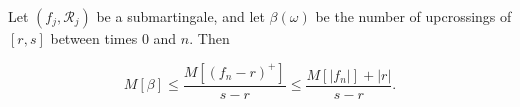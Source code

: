 Let $(f_j, \mathcal{R}_j)$ be a submartingale, and let $\beta(\omega)$ be the number of upcrossings of $[r, s]$ between times $0$ and $n$. Then

$$M[\beta] \leq \frac{M[(f_n - r)^+]}{s - r} \leq \frac{M[|f_n|] + |r|}{s - r}.$$

